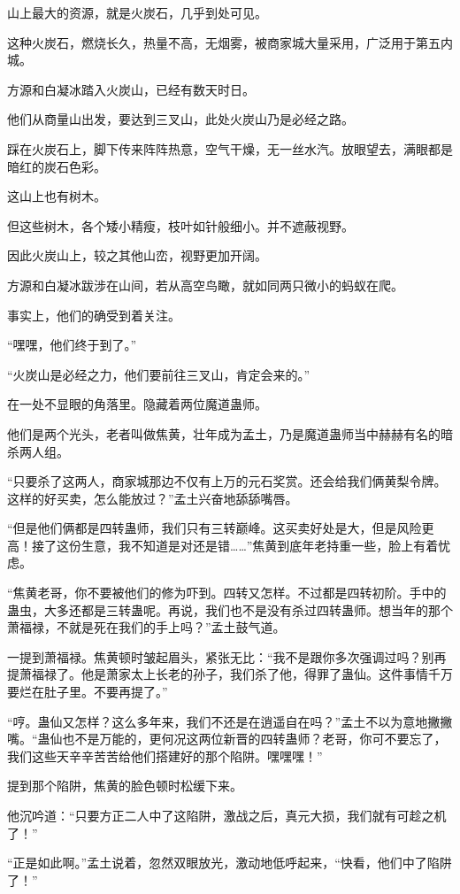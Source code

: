 \begin{this_body}
山上最大的资源，就是火炭石，几乎到处可见。

这种火炭石，燃烧长久，热量不高，无烟雾，被商家城大量采用，广泛用于第五内城。

方源和白凝冰踏入火炭山，已经有数天时日。

他们从商量山出发，要达到三叉山，此处火炭山乃是必经之路。

踩在火炭石上，脚下传来阵阵热意，空气干燥，无一丝水汽。放眼望去，满眼都是暗红的炭石色彩。

这山上也有树木。

但这些树木，各个矮小精瘦，枝叶如针般细小。并不遮蔽视野。

因此火炭山上，较之其他山峦，视野更加开阔。

方源和白凝冰跋涉在山间，若从高空鸟瞰，就如同两只微小的蚂蚁在爬。

事实上，他们的确受到着关注。

“嘿嘿，他们终于到了。”

“火炭山是必经之力，他们要前往三叉山，肯定会来的。”

在一处不显眼的角落里。隐藏着两位魔道蛊师。

他们是两个光头，老者叫做焦黄，壮年成为孟土，乃是魔道蛊师当中赫赫有名的暗杀两人组。

“只要杀了这两人，商家城那边不仅有上万的元石奖赏。还会给我们俩黄梨令牌。这样的好买卖，怎么能放过？”孟土兴奋地舔舔嘴唇。

“但是他们俩都是四转蛊师，我们只有三转巅峰。这买卖好处是大，但是风险更高！接了这份生意，我不知道是对还是错……”焦黄到底年老持重一些，脸上有着忧虑。

“焦黄老哥，你不要被他们的修为吓到。四转又怎样。不过都是四转初阶。手中的蛊虫，大多还都是三转蛊呢。再说，我们也不是没有杀过四转蛊师。想当年的那个萧福禄，不就是死在我们的手上吗？”孟土鼓气道。

一提到萧福禄。焦黄顿时皱起眉头，紧张无比：“我不是跟你多次强调过吗？别再提萧福禄了。他是萧家太上长老的孙子，我们杀了他，得罪了蛊仙。这件事情千万要烂在肚子里。不要再提了。”

“哼。蛊仙又怎样？这么多年来，我们不还是在逍遥自在吗？”孟土不以为意地撇撇嘴。“蛊仙也不是万能的，更何况这两位新晋的四转蛊师？老哥，你可不要忘了，我们这些天辛辛苦苦给他们搭建好的那个陷阱。嘿嘿嘿！”

提到那个陷阱，焦黄的脸色顿时松缓下来。

他沉吟道：“只要方正二人中了这陷阱，激战之后，真元大损，我们就有可趁之机了！”

“正是如此啊。”孟土说着，忽然双眼放光，激动地低呼起来，“快看，他们中了陷阱了！”


\end{this_body}
